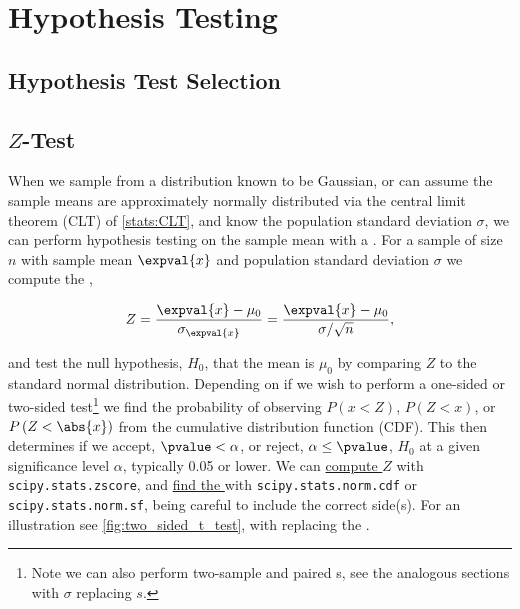\chapter{Hypothesis Testing}
\label{chap:hypo}

\section{Hypothesis Test Selection}
\label{hypo:test_selection}

\section{\texorpdfstring{$Z$}{Z}-Test}
\label{hypo:Z_test}

When we sample from a distribution known to be Gaussian,
or can assume the sample means are approximately normally distributed via the central limit theorem (CLT) of \cref{stats:CLT},
and know the population standard deviation $\sigma$,
we can perform hypothesis testing on the sample mean with a \Ztest.
For a sample of size $n$ with sample mean $\expval{x}$ and population standard deviation $\sigma$
we compute the \Zscore,

\begin{equation}\label{eq:hypo:Z}
Z = \frac{\expval{x} - \mu_{0}}{\sigma_{\expval{x}}} = \frac{\expval{x} - \mu_{0}}{\sigma/\sqrt{n}},
\end{equation}

\noindent and test the null hypothesis, $H_{0}$, that the mean is $\mu_{0}$
by comparing $Z$ to the standard normal distribution.
Depending on if we wish to perform a one-sided or two-sided
test\footnote{Note we can also perform two-sample and paired {\Ztest}s, see the analogous \ttest sections with $\sigma$ replacing $s$.} we
find the probability of observing $P\left(x < Z\right)$, $P\left(Z < x\right)$, or $P\left(Z < \abs{x}\right)$
from the cumulative distribution function (CDF).
This \pvalue then determines if we accept, $\pvalue < \alpha$, or reject, $\alpha \leq \pvalue$,
$H_{0}$ at a given significance level $\alpha$, typically \num{0.05} or lower.
We can
\href{https://docs.scipy.org/doc/scipy/reference/generated/scipy.stats.zscore.html}{compute $Z$} with
\texttt{scipy.stats.zscore},
and \href{https://docs.scipy.org/doc/scipy/reference/generated/scipy.stats.norm.html}{find the \pvalue} with
\texttt{scipy.stats.norm.cdf} or \texttt{scipy.stats.norm.sf},
being careful to include the correct side(s).
For an illustration see \cref{fig:two_sided_t_test}, with \Zscore replacing the \tstat.

